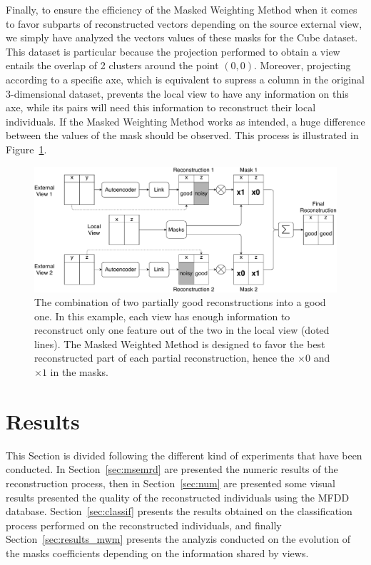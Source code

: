 Finally, to ensure the efficiency of the Masked Weighting Method when it comes to favor subparts of reconstructed vectors depending on the source external view, we simply have analyzed the vectors values of these masks for the Cube dataset. This dataset is particular because the projection performed to obtain a view entails the overlap of 2 clusters around the point $(0,0)$. Moreover, projecting according to a specific axe, which is equivalent to supress a column in the original 3-dimensional dataset, prevents the local view to have any information on this axe, while its pairs will need this information to reconstruct their local individuals. If the Masked Weighting Method works as intended, a huge difference between the values of the mask should be observed. This process is illustrated in Figure~\ref{fig:process_mwm}.

\begin{figure}[h]
    \centering
    \includegraphics[scale=.38]{img/process_mwm}
    \caption{The combination of two partially good reconstructions into a good one. In this example, each view has enough information to reconstruct only one feature out of the two in the local view (doted lines). The Masked Weighted Method is designed to favor the best reconstructed part of each partial reconstruction, hence the $\times 0$ and $\times 1$ in the masks.}
\label{fig:process_mwm}
\end{figure}
	
	\section{Results}
\label{sec:results}
This Section is divided following the different kind of experiments that have been conducted. In Section~\ref{sec:msemrd} are presented the numeric results of the reconstruction process, then in Section~\ref{sec:num} are presented some visual results presented the quality of the reconstructed individuals using the MFDD database. Section~\ref{sec:classif} presents the results obtained on the classification process performed on the reconstructed individuals, and finally Section~\ref{sec:results_mwm} presents the analyzis conducted on the evolution of the masks coefficients depending on the information shared by views.

